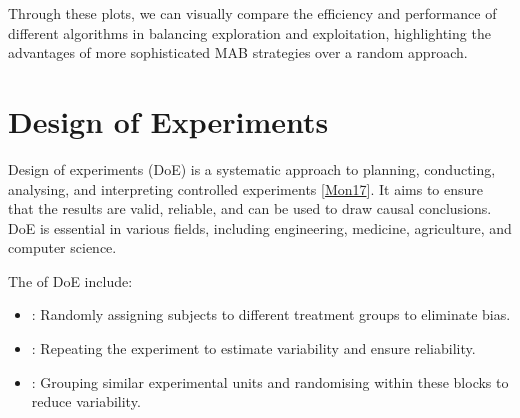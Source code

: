 \documentclass[letterpaper,10pt,english]{jupyterBook}
\begin{document}
\sphinxAtStartPar
Through these plots, we can visually compare the efficiency and performance of different algorithms in balancing exploration and exploitation, highlighting the advantages of more sophisticated MAB strategies over a random approach.

\sphinxstepscope


\chapter{Design of Experiments}
\label{\detokenize{notebooks/design_of_experiments:design-of-experiments}}\label{\detokenize{notebooks/design_of_experiments::doc}}
\sphinxAtStartPar
Design of experiments (DoE) is a systematic approach to planning, conducting, analysing, and interpreting controlled experiments {[}\hyperlink{cite.bibliography:id16}{Mon17}{]}. It aims to ensure that the results are valid, reliable, and can be used to draw causal conclusions. DoE is essential in various fields, including engineering, medicine, agriculture, and computer science.

\sphinxAtStartPar
The  of DoE include:
\begin{itemize}
\item {} 
\sphinxAtStartPar
{}: Randomly assigning subjects to different treatment groups to eliminate bias.

\item {} 
\sphinxAtStartPar
{}: Repeating the experiment to estimate variability and ensure reliability.

\item {} 
\sphinxAtStartPar
{}: Grouping similar experimental units and randomising within these blocks to reduce variability.

\end{itemize}
\end{document}
